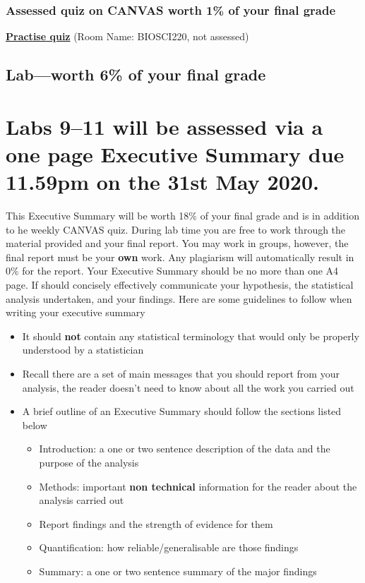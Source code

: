 \documentclass{article}
\begin{document}
\subsubsection*{Assessed quiz on CANVAS worth 1\% of your final grade}

\begin{center}
  \href{https://b.socrative.com/login/student/}{\textbf{\Large Practise quiz}} (Room Name: BIOSCI220, not assessed)
  
\end{center}



\subsection*{Lab---worth 6\% of your final grade}

\newpage

\section*{Labs 9--11 will be assessed via a one page Executive Summary due 11.59pm on the 31st May 2020.}

This Executive Summary will be worth  18\% of your final grade and is in addition to he weekly CANVAS quiz. During lab time you are free to work through the material provided and your final report. You may work in groups, however, the final report must be your \textbf{own} work. Any plagiarism will automatically result in 0\% for the report. Your Executive Summary should be no more than one A4 page. If should concisely effectively communicate your hypothesis, the statistical analysis undertaken, and your findings. Here are some guidelines to follow when writing your executive summary
\begin{itemize}
\item  It should \textbf{not} contain any statistical terminology that would only be properly understood by a statistician
  \item Recall there are a set of main messages that you should report from your analysis, the reader doesn't need to know about all the work you carried out
\item A brief outline of an Executive Summary should follow the sections listed below
  \begin{itemize}
\item Introduction: a one or two sentence description of the data and the purpose of the analysis
\item Methods: important \textbf{non technical} information for the reader about the analysis carried out
\item Report findings and the strength of evidence for them
\item Quantification: how reliable/generalisable are those findings
  \item Summary: a one or two sentence summary of the major findings
  \end{itemize}
\end{itemize}
\end{document}
